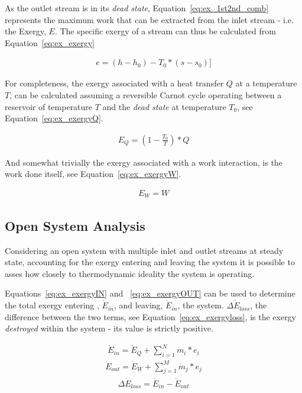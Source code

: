         As the outlet stream is in its \emph{dead state}, Equation~\eqref{eq:ex_1st2nd_comb} represents the maximum work that can be extracted from the inlet stream - i.e. the Exergy, \(E\). The specific exergy of a stream can thus be calculated from Equation~\eqref{eq:ex_exergy}
    
        \begin{align} 
            e = (h - h_0) - T_0*(s - s_0)] \label{eq:ex_exergy}
        \end{align}
    
        For completeness, the exergy associated with a heat transfer \(Q\) at a temperature \(T\), can be calculated assuming a reversible Carnot cycle operating between a reservoir of temperature \(T\) and the \emph{dead state} at temperature \(T_0\), see Equation~\eqref{eq:ex_exergyQ}.
    
        \begin{align} 
            E_Q = \left(1- \frac{T_0}{T}\right)*Q \label{eq:ex_exergyQ}
        \end{align}
    
        And somewhat trivially the exergy associated with a work interaction, is the work done itself, see Equation~\eqref{eq:ex_exergyW}.
    
        \begin{align} 
            E_W = W \label{eq:ex_exergyW}
        \end{align}

    \subsection{Open System Analysis}
        Considering an open system with multiple inlet and outlet streams at steady state, accounting for the exergy entering and leaving the system it is possible to asses how closely to thermodynamic ideality the system is operating.
        
        Equations~\eqref{eq:ex_exergyIN} and ~\eqref{eq:ex_exergyOUT} can be used to determine the total exergy entering , \(\Dot{E}_{in}\), and leaving, \(\Dot{E}_{in}\),  the system. \(\Delta\Dot{E}_{loss}\), the difference between the two terms, see Equation~\eqref{eq:ex_exergyloss}, is the exergy \emph{destroyed} within the system - its value is strictly positive.

        \begin{align} 
            \Dot{E}_{in} = \Dot{E}_Q + \sum_{i=1}^N \Dot{m}_i*e_i \label{eq:ex_exergyIN}
        \end{align}
        \begin{align}
            \Dot{E}_{out} = \Dot{E}_W + \sum_{j=1}^M \Dot{m}_j*e_j \label{eq:ex_exergyOUT}
        \end{align}
        \begin{align}
            \Delta\Dot{E}_{loss} = \Dot{E}_{in} - \Dot{E}_{out} \label{eq:ex_exergyloss}
        \end{align}

